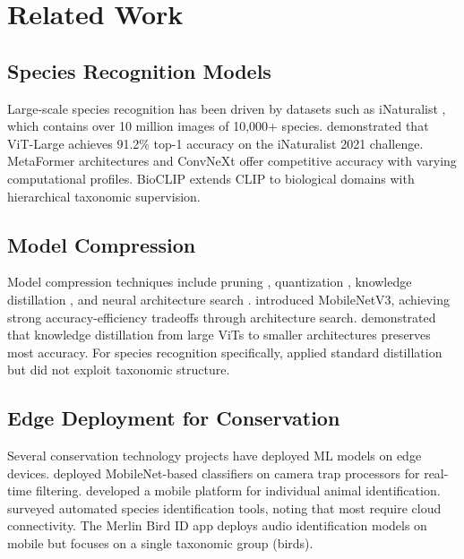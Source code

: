 \documentclass[11pt,a4paper]{article}
\begin{document}
\section{Related Work}
\label{sec:related}

\subsection{Species Recognition Models}

Large-scale species recognition has been driven by datasets such as iNaturalist \citep{vanhorn2018inaturalist}, which contains over 10 million images of 10,000+ species.
\citet{vanhorn2021benchmarking} demonstrated that ViT-Large achieves 91.2\% top-1 accuracy on the iNaturalist 2021 challenge.
MetaFormer architectures \citep{yu2022metaformer} and ConvNeXt \citep{liu2022convnet} offer competitive accuracy with varying computational profiles.
BioCLIP \citep{stevens2024bioclip} extends CLIP to biological domains with hierarchical taxonomic supervision.

\subsection{Model Compression}

Model compression techniques include pruning \citep{han2015learning}, quantization \citep{jacob2018quantization}, knowledge distillation \citep{hinton2015distilling}, and neural architecture search \citep{tan2019efficientnet}.
\citet{howard2019searching} introduced MobileNetV3, achieving strong accuracy-efficiency tradeoffs through architecture search.
\citet{touvron2021training} demonstrated that knowledge distillation from large ViTs to smaller architectures preserves most accuracy.
For species recognition specifically, \citet{picek2022overcoming} applied standard distillation but did not exploit taxonomic structure.

\subsection{Edge Deployment for Conservation}

Several conservation technology projects have deployed ML models on edge devices.
\citet{ahumada2020wildlife} deployed MobileNet-based classifiers on camera trap processors for real-time filtering.
\citet{bergerwolf2017wildbook} developed a mobile platform for individual animal identification.
\citet{terry2020automated} surveyed automated species identification tools, noting that most require cloud connectivity.
The Merlin Bird ID app \citep{wood2011ebird} deploys audio identification models on mobile but focuses on a single taxonomic group (birds).
\end{document}
